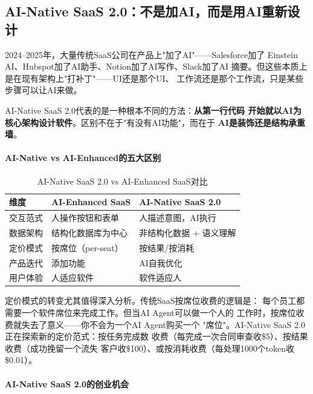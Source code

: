 \subsection{AI-Native SaaS 2.0：不是加AI，而是用AI重新设计}
\label{subsec:outlook-ai-native-saas}

2024--2025年，大量传统SaaS公司在产品上"加了AI"——Salesforce加了
Einstein AI、Hubspot加了AI助手、Notion加了AI写作、Slack加了AI
摘要。但这些本质上是在现有架构上"打补丁"——UI还是那个UI、
工作流还是那个工作流，只是某些步骤可以让AI来做。

AI-Native SaaS 2.0代表的是一种根本不同的方法：\textbf{从第一行代码
开始就以AI为核心架构设计软件}。区别不在于"有没有AI功能"，而在于
\textbf{AI是装饰还是结构承重墙}。

\paragraph{AI-Native vs AI-Enhanced的五大区别}

\begin{table}[htbp]
\centering
\caption{AI-Native SaaS 2.0 vs AI-Enhanced SaaS对比}
\label{tab:ai-native-vs-enhanced}
\small
\begin{tabularx}{\textwidth}{lXX}
\toprule
\rowcolor{figLightGray}
\textbf{维度} & \textbf{AI-Enhanced SaaS} & \textbf{AI-Native SaaS 2.0} \\
\midrule
交互范式 & 人操作按钮和表单 & 人描述意图，AI执行 \\
数据架构 & 结构化数据库为中心 & 非结构化数据 + 语义理解 \\
定价模式 & 按席位（per-seat） & 按结果/按消耗 \\
产品迭代 & 添加功能 & AI自我优化 \\
用户体验 & 人适应软件 & 软件适应人 \\
\bottomrule
\end{tabularx}
\end{table}

定价模式的转变尤其值得深入分析。传统SaaS按席位收费的逻辑是：
每个员工都需要一个软件席位来完成工作。但当AI Agent可以做一个人的
工作时，按席位收费就失去了意义——你不会为一个AI Agent购买一个
"席位"。AI-Native SaaS 2.0正在探索新的定价范式：按任务完成数
收费（每完成一次合同审查收\$5）、按结果收费（成功挽留一个流失
客户收\$100）、或按消耗收费（每处理1000个token收\$0.01）。

\paragraph{AI-Native SaaS 2.0的创业机会}

